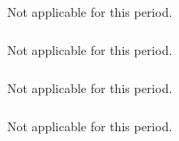 \medskip
  \subparagraph{}
  \label{hpc@hpc-mpir}

  Not applicable for this period.
  
  \subparagraph{}
  \label{hpc@hpc-combi}

  Not applicable for this period.


  \subparagraph{}
  \label{hpc@hpc-pythran}
  Not applicable for this period.





  \subparagraph{}
  \label{hpc@hpc-jupyter}
  
  Not applicable for this period.

